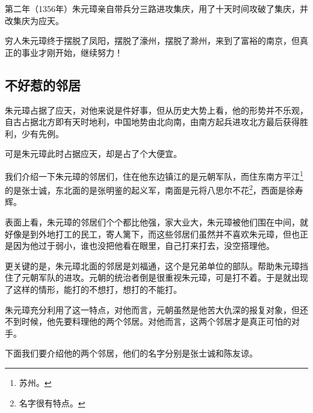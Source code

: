 \begin{multicols}{\theparacolNo}
		第二年（1356年）朱元璋亲自带兵分三路进攻集庆，用了十天时间攻破了集庆，并改集庆为应天。

		穷人朱元璋终于摆脱了凤阳，摆脱了濠州，摆脱了滁州，来到了富裕的南京，但真正的事业才刚开始，继续努力！

		\subsection{不好惹的邻居}
		朱元璋占据了应天，对他来说是件好事，但从历史大势上看，他的形势并不乐观，自古占据北方即有天时地利，中国地势由北向南，由南方起兵进攻北方最后获得胜利，少有先例。

		可是朱元璋此时占据应天，却是占了个大便宜。

		我们介绍一下朱元璋的邻居们，住在他东边镇江的是元朝军队，而住东南方平江\footnote{苏州。}的是张士诚，东北面的是张明鉴的起义军，南面是元将八思尔不花\footnote{名字很有特点。}，西面是徐寿辉。

		表面上看，朱元璋的邻居们个个都比他强，家大业大，朱元璋被他们围在中间，就好像是到外地打工的民工，寄人篱下，而这些邻居们虽然并不喜欢朱元璋，但也正是因为他过于弱小，谁也没把他看在眼里，自己打来打去，没空搭理他。

		更关键的是，朱元璋北面的邻居是刘福通，这个是兄弟单位的部队。帮助朱元璋挡住了元朝军队的进攻。元朝的统治者倒是很重视朱元璋，可是打不着。于是就出现了这样的情形，能打的不想打，想打的不能打。

		朱元璋充分利用了这一特点，对他而言，元朝虽然是他苦大仇深的报复对象，但还不到时候，他先要料理他的两个邻居。对他而言，这两个邻居才是真正可怕的对手。

		下面我们要介绍他的两个邻居，他们的名字分别是张士诚和陈友谅。
		\ifnum{}
	\end{multicols}
\fi
\newpage
